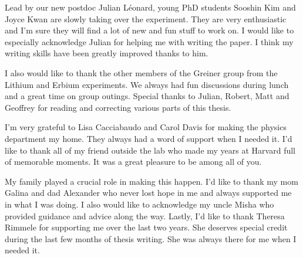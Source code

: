 Lead by our new postdoc Julian L\'eonard, young PhD students Sooshin Kim and Joyce Kwan are slowly taking over the experiment. They are very enthusiastic and I'm sure they will find a lot of new and fun stuff to work on. I would like to especially acknowledge Julian for helping me with writing the paper. I think my writing skills have been greatly improved thanks to him. 

I also would like to thank the other members of the Greiner group from the Lithium and Erbium experiments. We always had fun discussions during lunch and a great time on group outings. Special thanks to Julian, Robert, Matt and Geoffrey for reading and correcting various parts of this thesis.

I'm very grateful to Lisa Cacciabaudo and Carol Davis for making the physics department my home. They always had a word of support when I needed it. I'd like to thank all of my friend outside the lab who made my years at Harvard full of memorable moments. It was a great pleasure to be among all of you.

My family played a crucial role in making this happen. I'd like to thank my mom Galina and dad Alexander who never lost hope in me and always supported me in what I was doing. I also would like to acknowledge my uncle Misha who provided guidance and advice along the way. Lastly, I'd like to thank Theresa Rimmele for supporting me over the last two years. She deserves special credit during the last few months of thesis writing. She was always there for me when I needed it.
